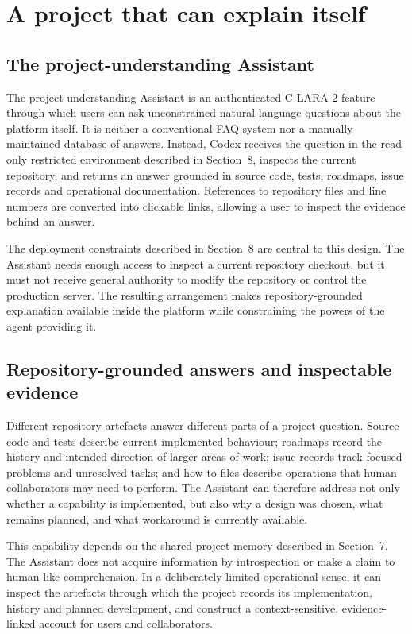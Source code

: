 \section{A project that can explain itself}

\subsection{The project-understanding Assistant}

The project-understanding Assistant is an authenticated C-LARA-2 feature
through which users can ask unconstrained natural-language questions about the
platform itself. It is neither a conventional FAQ system nor a manually
maintained database of answers. Instead, Codex receives the question in the
read-only restricted environment described in Section~8, inspects the current
repository, and returns an answer grounded in source code, tests, roadmaps,
issue records and operational documentation. References to repository files
and line numbers are converted into clickable links, allowing a user to
inspect the evidence behind an answer.

The deployment constraints described in Section~8 are central to this design.
The Assistant needs enough access to inspect a current repository checkout,
but it must not receive general authority to modify the repository or control
the production server. The resulting arrangement makes repository-grounded
explanation available inside the platform while constraining the powers of the
agent providing it.

\subsection{Repository-grounded answers and inspectable evidence}

Different repository artefacts answer different parts of a project question.
Source code and tests describe current implemented behaviour; roadmaps record
the history and intended direction of larger areas of work; issue records
track focused problems and unresolved tasks; and how-to files describe
operations that human collaborators may need to perform. The Assistant can
therefore address not only whether a capability is implemented, but also why a
design was chosen, what remains planned, and what workaround is currently
available.

This capability depends on the shared project memory described in Section~7.
The Assistant does not acquire information by introspection or make a claim to
human-like comprehension. In a deliberately limited operational sense, it can
inspect the artefacts through which the project records its implementation,
history and planned development, and construct a context-sensitive,
evidence-linked account for users and collaborators.

